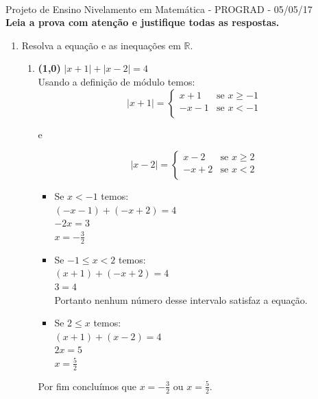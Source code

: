 \documentclass[a4paper,12pt]{article}
\newcommand{\RR}{\mathbb{R}}
\newcommand{\ds}{\displaystyle}
\begin{document}
\vspace{5mm}
\\[3mm]
{\large Projeto de Ensino Nivelamento em Matemática - PROGRAD - 05/05/17}\\[3mm]
{\bf Leia a prova  com atenção e justifique todas as respostas.}

\vspace{5mm}

\begin{enumerate}
\item  Resolva a equação e as inequações em $\RR$.
 \begin{enumerate}
 \item {\bf (1,0)} $\ds |x+1|+|x-2|=4$\\
 Usando a definição de módulo temos:\\
  $$ |x+1| =  \left\{
\begin{array}{ll}
      x+1 & \mbox{se }  x \geq -1 \\
      -x -1 & \mbox{se } x < -1 \\
\end{array} 
 \right. $$
 \begin{center} e \end{center}
 $$ |x-2| =  \left\{
\begin{array}{ll}
      x - 2 & \mbox{se }  x \geq 2 \\
      -x + 2 & \mbox{se } x < 2 \\
\end{array} 
 \right. $$

 

 \begin{itemize}
  \item Se $x<-1$ temos:\\
  $(-x-1)+(-x+2)=4$\\
  $-2x=3$\\
  $x= -\frac{3}{2}$\\
  \item Se $-1\leq x < 2$ temos:\\
  $(x+1)+(-x+2)=4$\\
  $3=4$\\
  Portanto nenhum número desse intervalo satisfaz a equação.\\
  \item Se  $2 \leq x$ temos:\\
  $(x+1)+(x-2)=4$\\
  $2x=5$\\
  $x=\frac{5}{2}$\\
  \end{itemize}
  Por fim concluímos que $x=- \frac{3}{2}$ ou $x=\frac{5}{2}$.\\
  

\end{enumerate}
\end{enumerate}
\end{document}
